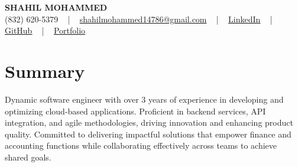 \documentclass[letterpaper,10pt]{article}
\begin{document}
\begin{center}
    {\fontsize{14pt}{12pt}\selectfont \textbf{\MakeUppercase{Shahil Mohammed}}}\\ \vspace{2pt}
    \fontsize{10pt}{12pt}\selectfont (832) 620-5379 ~ | ~ \href{mailto:shahilmohammed14786@gmail.com}{shahilmohammed14786@gmail.com} ~ | ~  
    \href{https://www.linkedin.com/in/shahil-mohammed-9652931a1/}{\color{blue}\underline{LinkedIn}}  ~ | ~ 
    \href{https://github.com/freakbeast14}{\color{blue}\underline{GitHub}} ~ | ~ 
    \href{https://shahil-mohammed.netlify.app/}{\color{blue}\underline{Portfolio}}
    \vspace{-8pt}
\end{center}

\section{Summary}
\vspace{-2pt}\fontsize{8pt}{9pt}\selectfont
Dynamic software engineer with over 3 years of experience in developing and optimizing cloud-based applications. Proficient in backend services, API integration, and agile methodologies, driving innovation and enhancing product quality. Committed to delivering impactful solutions that empower finance and accounting functions while collaborating effectively across teams to achieve shared goals.
 \vspace{-5pt}
 
\vspace{-2pt}
\end{document}
